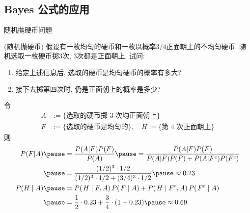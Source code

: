 \subsection{Bayes 公式的应用}
\begin{frame}{随机抛硬币问题}
	\begin{exam}({\tc 随机抛硬币}) 假设有一枚均匀的硬币和一枚以概率$3/4$正面朝上的不均匀硬币. 随机选取一枚硬币掷$3$次, $3$次都是正面朝上. 试问: %
		\vspace{-0.4cm}
	\begin{enumerate}[<+-|alert@+>]
		\item 给定上述信息后, 选取的硬币是均匀硬币的概率有多大?
		\item 接下去掷第四次时, 仍是正面朝上的概率是多少?
		\end{enumerate}
	\end{exam}
	\pause
\begin{jieda}
  令 \begin{align*}
	A &:=\{\mbox{选取的硬币掷 3 次均正面朝上}\}\\
	F & :=\{\mbox{选取的硬币是均匀的}\},\quad
	H :=\{\mbox{第 4 次正面朝上} \}
  \end{align*}
  则\pause
  {\small \begin{align*}
	P(F|A) \pause &=\frac{P(A|F)P(F)}{P(A)}\pause =\frac{P(A|F)P(F)}{P(A|F)P(F)+P(A|F^c)P(F^c)} \\
	\pause &=\frac{(1/2)^3 \cdot 1/2}{(1/2)^3 \cdot 1/2 +(3/4)^3 \cdot  1/2}\pause \approx 0.23\\
    P(H\mid A)\pause & =P(\left.H\mid F,A\right)P(\left.F\mid A\right)+P(\left.H\mid F^{\mathrm{c}},A\right)P(\left.F^{\mathrm{c}}\mid A\right)  \\
	\pause &=\frac{1}{2}\cdot0.23+\frac{3}{4}\cdot(1-0.23) \pause \approx 0.69.
  \end{align*}}
\end{jieda}



\end{frame}








